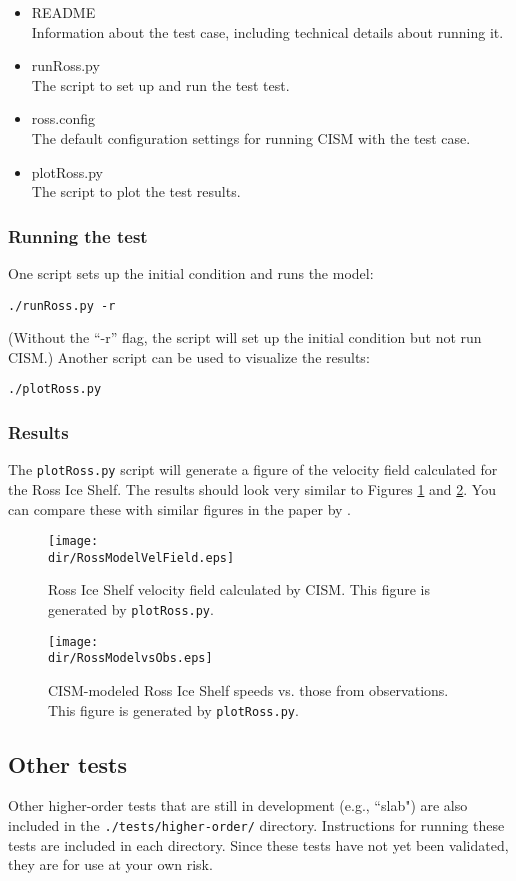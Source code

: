 \begin{itemize}
	\item README \\
		Information about the test case, including technical details about running it.
	\item runRoss.py \\
		The script to set up and run the test test.
	\item ross.config \\
  The default configuration settings for running CISM with the test case.
	\item plotRoss.py \\
		The script to plot the test results.
\end{itemize}

\subsubsection{Running the test}
One script sets up the initial condition and runs the model:

\texttt{./runRoss.py -r}

\noindent
(Without the ``-r'' flag, the script will set up the initial condition but not run CISM.)
Another script can be used to visualize the results:

\texttt{./plotRoss.py}

\subsubsection{Results}
The \texttt{plotRoss.py} script will generate a figure of the velocity field
calculated for the Ross Ice Shelf.  The results should look very similar to Figures \ref{fig:rossresults1} and \ref{fig:rossresults2}. You can
compare these with similar figures in the paper by \citet{MacAyeal:1996vn}.

\begin{figure}[H!]
	\centering
	\texttt{[image: \\dir/RossModelVelField.eps]}
	\caption{Ross Ice Shelf velocity field calculated by CISM. This figure is generated by \texttt{plotRoss.py}.}
	\label{fig:rossresults1}
\end{figure}

\begin{figure}[H!]
	\centering
	\texttt{[image: \\dir/RossModelvsObs.eps]}
	\caption{CISM-modeled Ross Ice Shelf speeds vs. those from observations. This figure is generated by \texttt{plotRoss.py}.}
	\label{fig:rossresults2}
\end{figure}
\FloatBarrier


\subsection{Other tests}
Other higher-order tests that are still in development (e.g., ``slab") are also included in the \texttt{./tests/higher-order/}
directory. Instructions for running these tests are included in each directory. Since these tests have not yet been validated, 
they are for use at your own risk.


